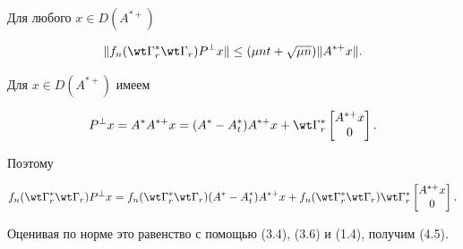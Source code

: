 \begin{lem}


Для любого $x\in D(A^{*+})$


\begin{equation}


\|f_n(\wt \Gamma_r^*\wt \Gamma_r)P^\bot x\|\le (\mu nt+\sqrt{\mu n})


\|A^{*+}x\|.


\end{equation}


\end{lem}








\begin{pf}


Для $x\in D(A^{*+})$ имеем


$$


P^\bot x=A^*A^{*+}x=(A^*-A_t^*)A^{*+}x+\wt \Gamma_r^*


\begin{bmatrix}A^{*+}x\\ 0\end{bmatrix}.


$$


Поэтому


$$


f_n(\wt \Gamma_r^*\wt \Gamma_r)P^\bot x


=f_n(\wt \Gamma_r^*\wt \Gamma_r)(A^*-A_t^*)A^{*+}x+


f_n(\wt \Gamma_r^*\wt \Gamma_r)


\wt \Gamma_r^* \begin{bmatrix}A^{*+}x\\ 0\end{bmatrix}.


$$


Оценивая по норме это равенство с помощью (3.4), (3.6) и (1.4), получим (4.5).


\end{pf}








